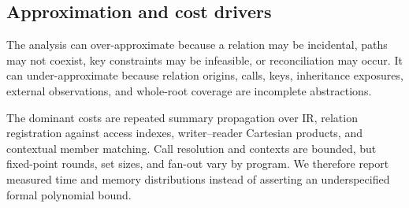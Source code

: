\subsection{Approximation and cost drivers}

The analysis can over-approximate because a relation may be incidental, paths may not coexist, key constraints may be infeasible, or reconciliation may occur. It can under-approximate because relation origins, calls, keys, inheritance exposures, external observations, and whole-root coverage are incomplete abstractions.

The dominant costs are repeated summary propagation over IR, relation registration against access indexes, writer--reader Cartesian products, and contextual member matching. Call resolution and contexts are bounded, but fixed-point rounds, set sizes, and fan-out vary by program. We therefore report measured time and memory distributions instead of asserting an underspecified formal polynomial bound.
